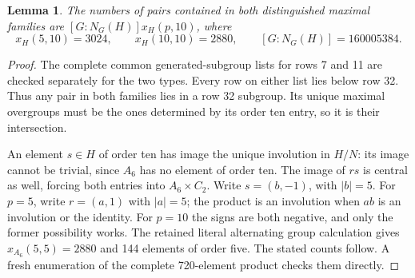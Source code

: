 \documentclass[11pt,a4paper]{article}
\newtheorem{lemma}{Lemma}\newtheorem{theorem}{Theorem}
\begin{document}
\begin{lemma}\label{H}
The numbers of pairs contained in both distinguished maximal
families are $[G:N_G(H)]x_H(p,10)$, where
\[
 x_H(5,10)=3024,\qquad x_H(10,10)=2880,
 \qquad [G:N_G(H)]=160005384.
\]
\end{lemma}
\begin{proof}
The complete common generated-subgroup lists for rows 7 and 11
are checked separately for the two types. Every row on either
list lies below row 32. Thus any pair in both families lies in a
row 32 subgroup. Its unique maximal overgroups must be the ones
determined by its order ten entry, so it is their intersection.

An element $s\in H$ of order ten has image the unique involution
in $H/N$: its image cannot be trivial, since $A_6$ has no element
of order ten. The image of $rs$ is central as well, forcing both
entries into $A_6\times C_2$. Write $s=(b,-1)$, with $|b|=5$.
For $p=5$, write $r=(a,1)$ with $|a|=5$; the product is an
involution when $ab$ is an involution or the identity. For $p=10$
the signs are both negative, and only the former possibility
works. The retained literal alternating group calculation gives
$x_{A_6}(5,5)=2880$ and 144 elements of order five. The stated
counts follow. A fresh enumeration of the complete 720-element
product checks them directly.
\end{proof}
\end{document}
